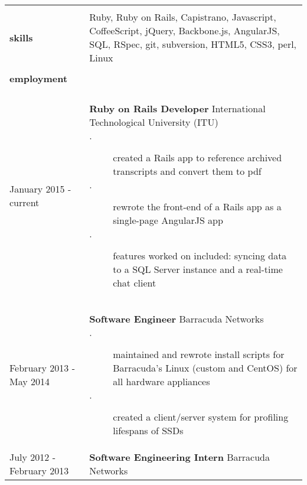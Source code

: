 \documentclass{article}
\begin{document}
\begin{tabular}{L{3cm} R{13.50cm}}

    \\ \hline \\

    \large{\textbf{skills}}
    \normalsize

    &

    Ruby, Ruby on Rails, Capistrano, Javascript, CoffeeScript, jQuery, 
    Backbone.js, AngularJS, SQL, RSpec, git, subversion, HTML5, CSS3, perl, Linux

    \\ \hline \\

    \large{\textbf{employment}} \\\\
    \normalsize

    January 2015 - current
    &
    \textbf{Ruby on Rails Developer}
    International Technological University (ITU)

    \begin{description}
        \item[$\cdot$] created a Rails app to reference archived
            transcripts and convert them to pdf 
        \item[$\cdot$] rewrote the front-end of a Rails app as a
            single-page AngularJS app
        \item[$\cdot$] features worked on included: syncing data
            to a SQL Server instance and a real-time chat client
    \end{description}

    \\

    February 2013 - May 2014
    &
    \textbf{Software Engineer}
    Barracuda Networks

    \begin{description}
        \item[$\cdot$] maintained and rewrote install scripts for Barracuda's Linux 
            (custom and CentOS) for all hardware appliances
        \item[$\cdot$] created a client/server system for profiling lifespans of
            SSDs
    \end{description}

    \\
    
    July 2012 - February 2013
    &
    \textbf{Software Engineering Intern}
    Barracuda Networks


\end{tabular}
\end{document}
